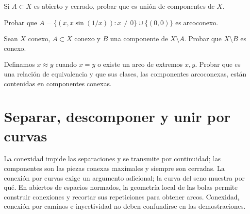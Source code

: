 \begin{ejercicio}\label{ej:lectura-18-4}
Si $A\subset X$ es abierto y cerrado, probar que es unión de componentes de $X$.
\end{ejercicio}


\begin{ejercicio}\label{ej:lectura-18-5}
Probar que $A=\{(x,x\sin(1/x)):x\ne0\}\cup\{(0,0)\}$ es arcoconexo.
\end{ejercicio}


\begin{ejercicio}\label{ej:lectura-18-6}
Sean $X$ conexo, $A\subset X$ conexo y $B$ una componente de $X\setminus A$. Probar que $X\setminus B$ es conexo.
\end{ejercicio}


\begin{ejercicio}\label{ej:lectura-18-7}
Definamos $x\approx y$ cuando $x=y$ o existe un arco de extremos $x,y$. Probar que es una relación de equivalencia y que sus clases, las componentes arcoconexas, están contenidas en componentes conexas.
\end{ejercicio}


\section{Separar, descomponer y unir por curvas}
La conexidad impide las separaciones y se transmite por continuidad; las componentes son las piezas conexas maximales y siempre son cerradas. La conexión por curvas exige un argumento adicional; la curva del seno muestra por qué. En abiertos de espacios normados, la geometría local de las bolas permite construir conexiones y recortar sus repeticiones para obtener arcos. Conexidad, conexión por caminos e inyectividad no deben confundirse en las demostraciones.
